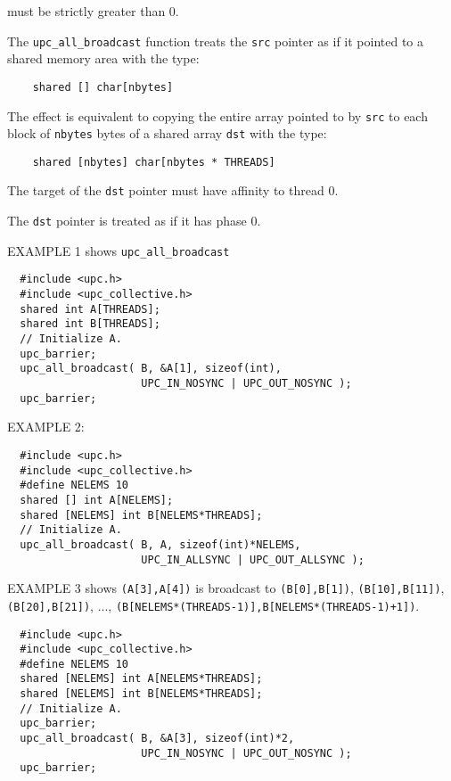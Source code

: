  must be strictly greater than 0.

\np The {\tt upc\_all\_broadcast} function treats the {\tt src} pointer
as if it pointed to a shared memory area with the type:

\begin{verbatim}
    shared [] char[nbytes]
\end{verbatim}  

\np The effect is equivalent to copying the entire array pointed to by
{\tt src} to each block of {\tt nbytes} bytes of a shared
array {\tt dst} with the type:

\begin{verbatim}
    shared [nbytes] char[nbytes * THREADS]
\end{verbatim}  

\np The target of the {\tt dst} pointer must have affinity to
thread 0.

\np The {\tt dst} pointer is treated as if it has phase 0.

\np EXAMPLE 1 shows {\tt upc\_all\_broadcast}
\begin{verbatim}
  #include <upc.h>
  #include <upc_collective.h>
  shared int A[THREADS];
  shared int B[THREADS];
  // Initialize A.
  upc_barrier;
  upc_all_broadcast( B, &A[1], sizeof(int),
                     UPC_IN_NOSYNC | UPC_OUT_NOSYNC );
  upc_barrier;
\end{verbatim}

\np EXAMPLE 2:
\begin{verbatim}
  #include <upc.h>
  #include <upc_collective.h>
  #define NELEMS 10
  shared [] int A[NELEMS];
  shared [NELEMS] int B[NELEMS*THREADS];
  // Initialize A.
  upc_all_broadcast( B, A, sizeof(int)*NELEMS,
                     UPC_IN_ALLSYNC | UPC_OUT_ALLSYNC );
\end{verbatim}

\np EXAMPLE 3 shows {\tt (A[3],A[4])} is broadcast to
{\tt (B[0],B[1])}, {\tt (B[10],B[11])}, \\
{\tt (B[20],B[21])}, ..., 
{\tt (B[NELEMS*(THREADS-1)],B[NELEMS*(THREADS-1)+1])}.
\begin{verbatim}
  #include <upc.h>
  #include <upc_collective.h>
  #define NELEMS 10
  shared [NELEMS] int A[NELEMS*THREADS];
  shared [NELEMS] int B[NELEMS*THREADS];
  // Initialize A.
  upc_barrier;
  upc_all_broadcast( B, &A[3], sizeof(int)*2,
                     UPC_IN_NOSYNC | UPC_OUT_NOSYNC );
  upc_barrier;
\end{verbatim}

